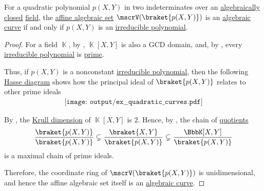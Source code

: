 \begin{proposition}\label{thm:quadratic_polynomial_irreducibility}
  For a quadratic polynomial \( p(X, Y) \) in two indeterminates over an \hyperref[def:algebraically_closed_field]{algebraically closed} \hyperref[def:field]{field}, the \hyperref[def:affine_algebraic_set]{affine algebraic set} \( \mscrV(\braket{ p(X, Y) }) \) is an \hyperref[def:affine_algebraic_set/variety]{algebraic curve} if and only if \( p(X, Y) \) is an \hyperref[def:domain_divisibility/irreducible]{irreducible polynomial}.
\end{proposition}
\begin{proof}
  For a field \( \BbbK \), by , \( \BbbK[X, Y] \) is also a GCD domain, and, by , every \hyperref[def:domain_divisibility/irreducible]{irreducible polynomial} is \hyperref[def:domain_divisibility/prime]{prime}.

  Thus, if \( p(X, Y) \) is a nonconstant \hyperref[def:domain_divisibility/irreducible]{irreducible polynomial}, then the following \hyperref[def:hasse_diagram]{Hasse diagram} shows how the principal ideal of \( \braket{ p(X, Y) } \) relates to other prime ideals
  \begin{equation*}
    \begin{aligned}
      \texttt{[image: output/ex\_\_quadratic\_curves.pdf]}
    \end{aligned}
  \end{equation*}

  By , the \hyperref[def:krull_dimension]{Krull dimension} of \( \BbbK[X, Y] \) is \( 2 \). Hence, by , the chain of \hyperref[def:ring/quotient]{quotients}
  \begin{equation*}
    \frac {\braket{ p(X, Y) }} {\braket{ p(X, Y) }} \subsetneq \frac {\braket{ X, Y }} {\braket{ p(X, Y) }} \subsetneq \frac {\BbbK[X, Y]} {\braket{ p(X, Y) }}
  \end{equation*}
  is a maximal chain of prime ideals.

  Therefore, the coordinate ring of \( \mscrV(\braket{ p(X, Y) }) \) is unidimensional, and hence the affine algebraic set itself is an \hyperref[def:affine_algebraic_set/curve]{algebraic curve}.
\end{proof}


